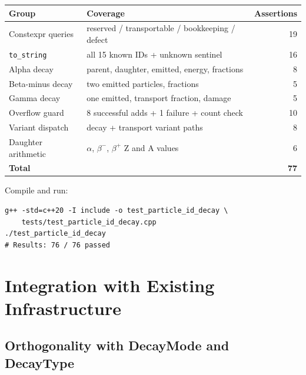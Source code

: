 \documentclass[11pt,a4paper]{article}
\begin{document}
\begin{center}
\begin{tabular}{llr}
\toprule
\textbf{Group} & \textbf{Coverage} & \textbf{Assertions} \\
\midrule
Constexpr queries      & reserved / transportable / bookkeeping / defect & 19 \\
\texttt{to\_string}    & all 15 known IDs + unknown sentinel              & 16 \\
Alpha decay            & parent, daughter, emitted, energy, fractions     &  8 \\
Beta-minus decay       & two emitted particles, fractions                 &  5 \\
Gamma decay            & one emitted, transport fraction, damage          &  5 \\
Overflow guard         & 8 successful adds + 1 failure + count check      & 10 \\
Variant dispatch       & decay + transport variant paths                  &  8 \\
Daughter arithmetic    & $\alpha$, $\beta^-$, $\beta^+$ Z and A values   &  6 \\
\midrule
\textbf{Total}         &                                                  & \textbf{77} \\
\bottomrule
\end{tabular}
\end{center}

Compile and run:

\begin{lstlisting}[style=cpp20, language={},
  caption={Build and execute}]
g++ -std=c++20 -I include -o test_particle_id_decay \
    tests/test_particle_id_decay.cpp
./test_particle_id_decay
# Results: 76 / 76 passed
\end{lstlisting}

\section{Integration with Existing Infrastructure}
\label{sec:integration}

\subsection{Orthogonality with DecayMode and DecayType}
\end{document}

